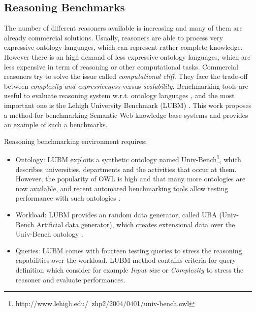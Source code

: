 \subsection{Reasoning Benchmarks}\label{sec:lubm}

The number of different reasoners available is increasing and many of them are already commercial solutions. Usually, reasoners are able to process very expressive ontology languages, which can represent rather complete knowledge. However there is an high demand of less expressive ontology languages, which are less expensive in term of reasoning or other computational tasks. Commercial reasoners try to solve the issue called \textit{computational cliff}. They face the trade-off between \textit{complexity and expressiveness} versus \textit{scalability}. Benchmarking tools are useful to evaluate reasoning system w.r.t. ontology languages \cite{bock2008benchmarking}, and the most important one is the Lehigh University Benchmark  (LUBM) \cite{Guo2005}. This work proposes a  method for benchmarking Semantic Web knowledge base systems and provides an example of such a benchmarks.

Reasoning benchmarking environment requires:
\begin{itemize}
\item Ontology: LUBM exploits a synthetic ontology named Univ-Bench\footnote{http://www.lehigh.edu/~zhp2/2004/0401/univ-bench.owl}, which describes universities, departments and the activities that occur at them. However, the popularity of OWL is high and that
many more ontologies are now available, and recent automated benchmarking tools allow testing performance with such ontologies \cite{gardiner2006automated}.

\item Workload: LUBM provides an random data generator, called UBA (Univ-Bench Artificial data generator), which creates extensional data over the Univ-Bench ontology \cite{Guo2005}.

\item Queries: LUBM comes with fourteen testing queries to stress the reasoning capabilities over the workload. LUBM method contains criteria for query definition which consider for example \textit{Input size} or \textit{Complexity} to stress the reasoner and evaluate performances.
\end{itemize}


